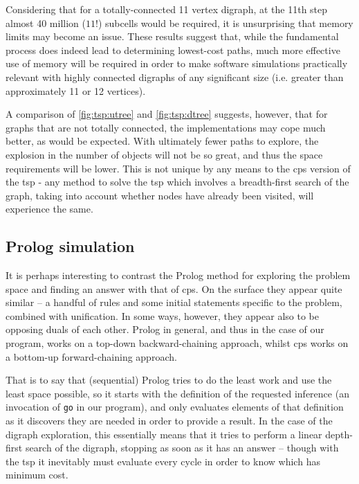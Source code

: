 Considering that for a totally-connected 11 vertex digraph, at the 11th step almost 40 million (\(11!\)) subcells would be required, it is unsurprising that memory limits may become an issue.  These results suggest that, while the fundamental process does indeed lead to determining lowest-cost paths, much more effective use of memory will be required in order to make software simulations practically relevant with highly connected digraphs of any significant size (i.e. greater than approximately 11 or 12 vertices).

A comparison of \autoref{fig:tsp:utree} and \autoref{fig:tsp:dtree} suggests, however, that for graphs that are not totally connected, the implementations may cope much better, as would be expected.  With ultimately fewer paths to explore, the explosion in the number of objects will not be so great, and thus the space requirements will be lower.  This is not unique by any means to the \gls{cps} version of the \gls{tsp} - any method to solve the \gls{tsp} which involves a breadth-first search of the graph, taking into account whether nodes have already been visited, will experience the same. 


\subsection{Prolog simulation}

It is perhaps interesting to contrast the Prolog method for exploring the problem space and finding an answer with that of \gls{cps}.  On the surface they appear quite similar -- a handful of rules and some initial statements specific to the problem, combined with unification.   In some ways, however, they appear also to be opposing duals of each other.  Prolog in general, and thus in the case of our program, works on a top-down backward-chaining approach, whilst \gls{cps} works on a bottom-up forward-chaining approach.

That is to say that (sequential) Prolog tries to do the least work and use the least space possible, so it starts with the definition of the requested inference (an invocation of \texttt{go} in our program), and only evaluates elements of that definition as it discovers they are needed in order to provide a result.  In the case of the digraph exploration, this essentially means that it tries to perform a linear depth-first search of the digraph, stopping as soon as it has an answer -- though with the \gls{tsp} it inevitably must evaluate every cycle in order to know which has minimum cost.

